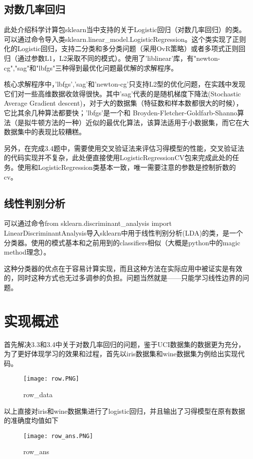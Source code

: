 \documentclass[UTF8]{ctexart}
\begin{document}
\subsection{对数几率回归}
此处介绍科学计算包sklearn当中支持的关于Logistic回归（对数几率回归）的类。可以通过命令导入类sklearn.linear\_model.LogisticRegression。这个类实现了正则化的Logistic回归，支持二分类和多分类问题（采用OvR策略）或者多项式正则回归（通过参数L1，L2采取不同的模式）。使用了'liblinear'库，有"newton-cg","sag"和"lbfgs"三种得到最优化问题最优解的求解程序。

核心求解程序中，'lbfgs','sag'和'newton-cg'只支持L2型的优化问题，在实践中发现它们对一些高维数据收敛得很快。其中'sag'代表的是随机梯度下降法(Stochastic Average Gradient descent)，对于大的数据集（特征数和样本数都很大的时候），它比其余几种算法都要快；'lbfgs'是一个和 Broyden-Fletcher-Goldfarb-Shanno算法（是拟牛顿方法的一种）近似的最优化算法，该算法适用于小数据集，而它在大数据集中的表现比较糟糕。

另外，在完成3.4题中，需要使用交叉验证法来评估习得模型的性能，交叉验证法的代码实现并不复杂，此处便直接使用LogisticRegressionCV包来完成此处的任务。使用和LogisticRegression类基本一致，唯一需要注意的参数是控制折数的cv。
\subsection{线性判别分析}
可以通过命令from sklearn.discriminant\_analysis import LinearDiscriminantAnalysis导入sklearn中用于线性判别分析(LDA)的类，是一个分类器。使用的模式基本和之前用到的classifiers相似（大概是python中的magic method理念）。

这种分类器的优点在于容易计算实现，而且这种方法在实际应用中被证实是有效的，同时这种方式也无过多调参的负担。问题当然就是——只能学习线性边界的问题。

\section{实现概述}
首先解决3.3和3.4中关于对数几率回归的问题，鉴于UCI数据集的数据更为充分，为了更好体现学习的效果和过程，首先以iris数据集和wine数据集为例给出实现代码。
\begin{figure}[htbp]
	\centering
	\texttt{[image: row.PNG]}
	\caption{row\_data}
\end{figure}

以上直接对iris和wine数据集进行了logistic回归，并且输出了习得模型在原有数据的准确度均值如下
\begin{figure}[htbp]
	\centering
	\texttt{[image: row\_ans.PNG]}
	\caption{row\_ans}
\end{figure}
\end{document}
